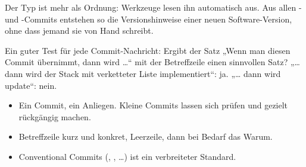 \begin{praxis}
Der Typ ist mehr als Ordnung: Werkzeuge lesen ihn automatisch aus. Aus allen
- und -Commits entstehen so die Versionshinweise einer neuen
Software-Version, ohne dass jemand sie von Hand schreibt.
\end{praxis}

\begin{erfahrung}
Ein guter Test für jede Commit-Nachricht: Ergibt der Satz „Wenn man diesen Commit
übernimmt, dann wird \ldots“ mit der Betreffzeile einen sinnvollen Satz? „\ldots{} dann wird
der Stack mit verketteter Liste implementiert“: ja. „\ldots{} dann wird update“: nein.
\end{erfahrung}

\begin{zusammenfassung}
\begin{itemize}[nosep]
  \item Ein Commit, ein Anliegen. Kleine Commits lassen sich prüfen und gezielt rückgängig machen.
  \item Betreffzeile kurz und konkret, Leerzeile, dann bei Bedarf das Warum.
  \item Conventional Commits (, , \ldots) ist ein verbreiteter Standard.
\end{itemize}
\end{zusammenfassung}
